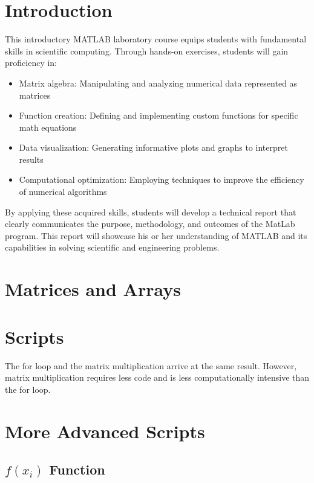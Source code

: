 \documentclass[12pt, a4paper]{article}
\begin{document}
	\section{Introduction}
		This introductory MATLAB laboratory course equips students with fundamental skills in scientific computing. Through hands-on exercises, students will gain proficiency in:
		\begin{itemize}
			\item Matrix algebra: Manipulating and analyzing numerical data represented as matrices
			\item Function creation: Defining and implementing custom functions for specific math equations
			\item Data visualization: Generating informative plots and graphs to interpret results
			\item Computational optimization: Employing techniques to improve the efficiency of numerical algorithms
		\end{itemize}
		By applying these acquired skills, students will develop a technical report that clearly communicates the purpose, methodology, and outcomes of the MatLab program. This report will showcase his or her understanding of MATLAB and its capabilities in solving scientific and engineering problems.
	\section{Matrices and Arrays}
		
		
	\section{Scripts}
		
		The for loop and the matrix multiplication arrive at the same result. However, matrix multiplication requires less code and is less computationally intensive than the for loop.
	\section{More Advanced Scripts}
		\subsection{$f(x_{i})$ Function}
			
\end{document}
